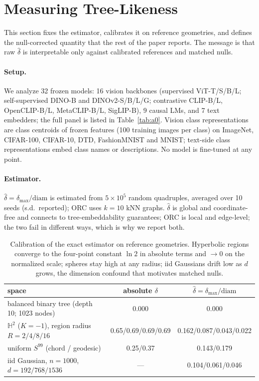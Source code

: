 \documentclass{article} %
\begin{document}
\section{Measuring Tree-Likeness}
\label{sec:method}

This section fixes the estimator, calibrates it on reference geometries, and defines the null-corrected quantity that the rest of the paper reports. The message is that raw $\hat\delta$ is interpretable only against calibrated references and matched nulls.

\paragraph{Setup.} We analyze 32 frozen models: 16 vision backbones (supervised ViT-T/S/B/L; self-supervised DINO-B and DINOv2-S/B/L/G; contrastive CLIP-B/L, OpenCLIP-B/L, MetaCLIP-B/L, SigLIP-B), 9 causal LMs, and 7 text embedders; the full panel is listed in Table~\ref{tab:a0}.
Vision class representations are class centroids of frozen features (100 training images per class) on ImageNet, CIFAR-100, CIFAR-10, DTD, FashionMNIST and MNIST; text-side class representations embed class names or descriptions. No model is fine-tuned at any point.

\paragraph{Estimator.} $\hat\delta = \delta_{\max}/\mathrm{diam}$ is estimated from $5{\times}10^5$ random quadruples, averaged over 10 seeds (s.d.\ reported); ORC uses $k{=}10$ kNN graphs. $\hat\delta$ is global and coordinate-free and connects to tree-embeddability guarantees; ORC is local and edge-level; the two fail in different ways, which is why we report both.

\begin{table}[t]
\centering
\small
\begin{tabular}{lcc}
\toprule
space & absolute $\delta$ & $\hat\delta=\delta_{\max}/\mathrm{diam}$ \\
\midrule
balanced binary tree (depth 10; 1023 nodes) & 0.000 & 0.000 \\
$\mathbb{H}^2$ ($K{=}-1$), region radius $R{=}2/4/8/16$ & 0.65/0.69/0.69/0.69 & 0.162/0.087/0.043/0.022 \\
uniform $S^{99}$ (chord / geodesic) & 0.25/0.37 & 0.143/0.179 \\
iid Gaussian, $n{=}1000$, $d{=}192/768/1536$ & --- & 0.104/0.061/0.046 \\
\bottomrule
\end{tabular}
\caption{Calibration of the exact estimator on reference geometries. Hyperbolic regions converge to the four-point constant $\ln 2$ in absolute terms and $\to 0$ on the normalized scale; spheres stay high at any radius; iid Gaussians drift low as $d$ grows, the dimension confound that motivates matched nulls. %
}
\label{tab:calibration}
\end{table}
\end{document}
